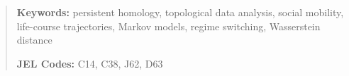 \documentclass[12pt, a4paper]{article}
\begin{document}
\begin{abstract}
\medskip
\noindent\textbf{Keywords:} persistent homology, topological data analysis, social mobility, life-course trajectories, Markov models, regime switching, Wasserstein distance

\medskip
\noindent\textbf{JEL Codes:} C14, C38, J62, D63
\end{abstract}

\newpage
\tableofcontents
\newpage



\nocite{*}  %

\end{document}
